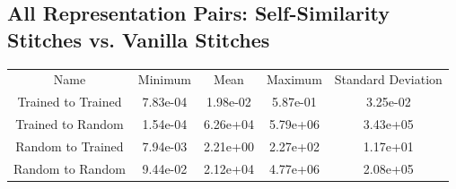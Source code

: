 \documentclass{article} %
\begin{document}
\subsection*{All Representation Pairs: Self-Similarity Stitches vs. Vanilla Stitches}
\begin{tabular}{c c c c c}
   Name&Minimum&Mean&Maximum&Standard Deviation\\
   Trained to Trained&7.83e-04&1.98e-02&5.87e-01&3.25e-02\\
   Trained to Random&1.54e-04&6.26e+04&5.79e+06&3.43e+05\\
   Random to Trained&7.94e-03&2.21e+00&2.27e+02&1.17e+01\\
   Random to Random&9.44e-02&2.12e+04&4.77e+06&2.08e+05\\
\end{tabular}

\end{document}

